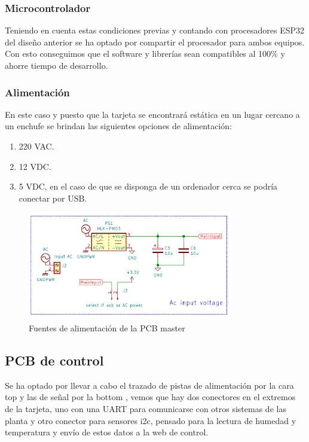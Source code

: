 \documentclass[paper=a4, fontsize=11pt,twoside]{scrartcl}	%
\begin{document}
        \subsubsection{Microcontrolador} 
            Teniendo en cuenta estas condiciones previas y contando con procesadores ESP32 del diseño anterior se ha optado por compartir 
            el procesador para ambos equipos. Con esto conseguimos que el software y librerías sean compatibles al 100\% y ahorre tiempo
            de desarrollo.
        \subsubsection{Alimentación} 
            En este caso y puesto que la tarjeta se encontrará estática en un lugar cercano a un enchufe se brindan las siguientes opciones
            de alimentación:
            \begin{enumerate}
                \item 220 VAC.
                \item 12 VDC.
                \item 5 VDC, en el caso de que se disponga de un ordenador cerca se podría conectar por USB.
            \end{enumerate}
            \begin{center}
                \begin{figure}[h]
                    \centering
                    \includegraphics[width=0.8\textwidth]{../receiver_main_power.PNG}
                    \caption{Fuentes de alimentación de la PCB master}
                    \label{fig:mesh4}
                \end{figure}    
            \end{center}    
    \subsection{PCB de control}
        Se ha optado por llevar a cabo el trazado de pistas de alimentación por la cara top y las de señal por la bottom , vemos que hay dos 
        conectores en el extremos de la tarjeta, uno con una UART para comunicarse con otros sistemas de las planta y otro conector para sensores
        i2c, pensado para la lectura de humedad y temperatura y envío de estos datos a la web de control.
\end{document}
